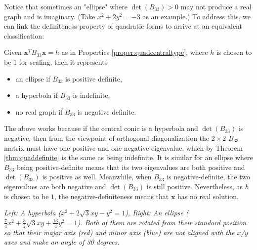 Notice that sometimes an "ellipse" where $\det(B_{33}) > 0$ may not produce a real graph and is imaginary. (Take $x^2 + 2y^2 = -3$ as an example.) To address this, we can link the definiteness property of quadratic forms to arrive at an equivalent classification:
\begin{thm}
\label{thm:quadcentraltypealt}
Given $\textbf{x}^TB_{33}\textbf{x} = h$ as in Properties \ref{proper:quadcentraltype}, where $h$ is chosen to be $1$ for scaling, then it represents
\begin{itemize}
\item an ellipse if $B_{33}$ is positive definite,
\item a hyperbola if $B_{33}$ is indefinite,
\item no real graph if $B_{33}$ is negative definite.
\end{itemize}
\end{thm}
The above works because if the central conic is a hyperbola and $\det(B_{33})$ is negative, then from the viewpoint of orthogonal diagonalization the $2 \times 2$ $B_{33}$ matrix must have one positive and one negative eigenvalue, which by Theorem \ref{thm:quaddefinite} is the same as being indefinite. It is similar for an ellipse where $B_{33}$ being positive-definite means that its two eigenvalues are both positive and $\det(B_{33})$ is positive as well. Meanwhile, when $B_{33}$ is negative-definite, the two eigenvalues are both negative and $\det(B_{33})$ is still positive. Nevertheless, as $h$ is chosen to be $1$, the negative-definiteness means that $\textbf{x}$ has no real solution.
\begin{center}
\end{center}
\textit{Left: A hyperbola ($x^2 + 2\sqrt{3}xy - y^2 = 1$), Right: An ellipse ($\frac{7}{4}x^2 + \frac{3}{2}\sqrt{3}xy + \frac{13}{4}y^2 = 1$). Both of them are rotated from their standard position so that their major axis (red) and minor axis (blue) are not aligned with the $x$/$y$ axes and make an angle of 30 degrees.}\par

